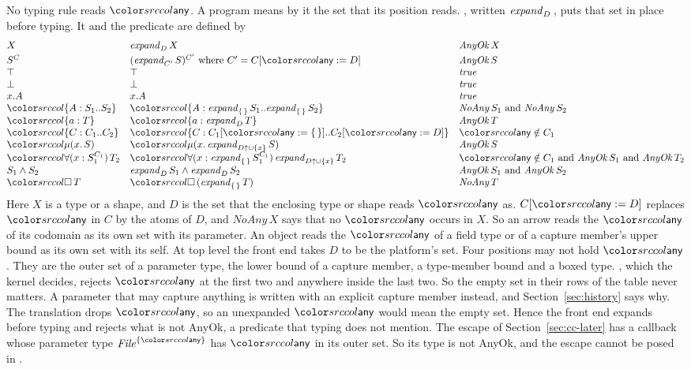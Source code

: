 No typing rule reads $\cany$. A program means by it the set that its position reads. , written $\mathit{expand}_{D}\,$, puts that set in place before typing. It and the predicate  are defined by
\[
\begin{array}{@{}l@{\quad}l@{\quad}l@{}}
X & \expd{D} X & \mathit{AnyOk}\,X \\[2pt]
\capt{S}{C} & \capt{(\expd{C'} S)}{C'} \text{ where } C' = C[\cany := D] & \mathit{AnyOk}\,S \\
\top & \top & \mathit{true} \\
\bot & \bot & \mathit{true} \\
x.A & x.A & \mathit{true} \\
\dtyp{A}{S_1}{S_2} & \dtyp{A}{\expd{\cempty} S_1}{\expd{\cempty} S_2} & \mathit{NoAny}\,S_1 \text{ and } \mathit{NoAny}\,S_2 \\
\dfld{a}{T} & \dfld{a}{\expd{D} T} & \mathit{AnyOk}\,T \\
\dcap{C}{C_1}{C_2} & \dcap{C}{C_1[\cany := \cempty]}{C_2[\cany := D]} & \cany \notin C_1 \\
\dmu{x}{S} & \dmu{x}{\expd{\weak{D} \cup \cset{x}} S} & \mathit{AnyOk}\,S \\
\dall{x}{\capt{S_1}{C_1}}{T_2} & \dall{x}{\expd{\cempty} \capt{S_1}{C_1}}{\expd{\weak{D} \cup \cset{x}} T_2} & \cany \notin C_1 \text{ and } \mathit{AnyOk}\,S_1 \text{ and } \mathit{AnyOk}\,T_2 \\
S_1 \wedge S_2 & \expd{D} S_1 \wedge \expd{D} S_2 & \mathit{AnyOk}\,S_1 \text{ and } \mathit{AnyOk}\,S_2 \\
\dbox{T} & \dbox{(\expd{\cempty} T)} & \mathit{NoAny}\,T
\end{array}
\]
Here $X$ is a type or a shape, and $D$ is the set that the enclosing type or shape reads $\cany$ as. $C[\cany := D]$ replaces $\cany$ in $C$ by the atoms of $D$, and $\mathit{NoAny}\,X$ says that no $\cany$ occurs in $X$. So an arrow reads the $\cany$ of its codomain as its own set with its parameter. An object reads the $\cany$ of a field type or of a capture member's upper bound as its own set with its self. At top level the front end takes $D$ to be the platform's set. Four positions may not hold $\cany$. They are the outer set of a parameter type, the lower bound of a capture member, a type-member bound and a boxed type. , which the kernel decides, rejects $\cany$ at the first two and anywhere inside the last two. So the empty set in their rows of the table never matters. A parameter that may capture anything is written with an explicit capture member instead, and Section~\ref{sec:history} says why. The translation drops $\cany$, so an unexpanded $\cany$ would mean the empty set. Hence the front end expands before typing and rejects what is not AnyOk, a predicate that typing does not mention. The escape of Section~\ref{sec:cc-later} has a callback whose parameter type $\capt{\mathit{File}}{\cset{\cany}}$ has $\cany$ in its outer set. So its type is not AnyOk, and the escape cannot be posed in \treeK.

